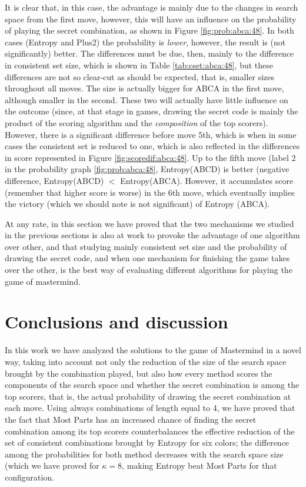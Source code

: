 \documentclass[preprint,12pt]{elsarticle}
\begin{document}
It is clear that, in this case, the advantage is mainly due to the
changes in search space from the first move, however, this will have
an influence on the probability of playing the secret combination, as
shown in Figure \ref{fig:prob:abca:48}. In both cases (Entropy and
Plus2) the probability is {\em lower}, however, the result is (not
significantly) better. The differences must be due, then, mainly to
the difference in consistent set size, which is shown in Table
\ref{tab:cset:abca:48}, but these differences are not so clear-cut as
should be expected, that is, smaller sizes throughout all moves. The
size is actually bigger for ABCA in the first move, although smaller
in the second. These two will actually have little influence on the
outcome (since, at that stage in games, drawing the secret code is
mainly the product of the scoring algorithm and the {\em composition}
of the top scorers). However, there is a significant difference before
move 5th, which is when in some cases the consistent set is reduced to
one, which is also reflected in the differences in score represented
in Figure \ref{fig:scoredif:abca:48}. Up to the fifth move (label 2 in
the probability graph \ref{fig:prob:abca:48}, Entropy(ABCD) is better
(negative difference, Entropy(ABCD) $<$ Entropy(ABCA). However, it
accumulates score (remember that higher score is worse) in the 6th
move, which eventually implies the victory (which we should note is
not significant) of Entropy (ABCA). 

At any rate, in this section we have proved that the two mechanisms we
studied in the previous sections is also at work to provoke the
advantage of one algorithm over other, and that studying mainly
consistent set size and the probability of drawing the secret code,
and when one mechanism for finishing the game takes over the other, is
the best way of evaluating different algorithms for playing the game
of mastermind. 


\section{Conclusions and discussion}
\label{s:c}

In this work we have analyzed the solutions to the game of Mastermind
in a novel way, taking into account not only the reduction of the size
of the search space brought by the combination played, but also how
every method scores the components of the search space and whether the
secret combination is among the top scorers, that is, the actual
probability of drawing the secret combination at each move. Using
always combinations of length equal to 4, we have proved that the
fact that Most Parts has an increased chance of finding the secret
combination among its top scorers counterbalances the effective
reduction of the set of consistent combinations brought by Entropy for
six colors; the difference among the probabilities for both method decreases with
the search space size (which we have proved for $\kappa=8$,
making Entropy beat Most Parts for that configuration.
\end{document}
